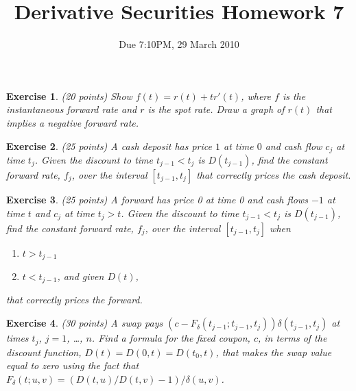 \documentclass[11pt,fleqn]{amsproc}
\newtheorem{xca}{Exercise}
\begin{document}
\title{Derivative Securities Homework 7}
\author{Due 7:10PM, 29 March 2010}

\maketitle


\begin{xca}{(20 points)}
Show $f(t) = r(t) + t r'(t)$, where $f$ is the instantaneous forward rate and
$r$ is the spot rate. Draw a graph of $r(t)$ that implies a
negative forward rate.
\end{xca}

\begin{xca}{(25 points)}
A cash deposit has price $1$ at time $0$ and cash flow $c_j$ at time $t_j$.
Given the discount to time $t_{j-1} < t_j$ is $D(t_{j-1})$, find the
constant forward rate, $f_j$,
over the interval $[t_{j-1}, t_j]$ that correctly prices the cash deposit.
\end{xca}

\begin{xca}{(25 points)}
A forward has price 0 at time 0 and cash flows $-1$ at time $t$ and $c_j$ at time $t_j > t$. Given
the discount to time $t_{j-1} < t_j$ is $D(t_{j-1})$, find the constant forward rate, $f_j$,
over the interval $[t_{j-1}, t_j]$ when
\begin{enumerate}
\item $t > t_{j-1}$
\item $t < t_{j-1}$, and given $D(t)$,
\end{enumerate}
that correctly prices the forward.
\end{xca}

\begin{xca}{(30 points)}
A swap pays $(c - F_\delta(t_{j-1}; t_{j-1}, t_j))\delta(t_{j-1}, t_j)$ at times $t_j$, $j = 1$, \dots, $n$.
Find a formula for the fixed coupon, $c$, in terms of the discount function, $D(t) = D(0,t) = D(t_0, t)$, that makes the
swap value equal to zero using the fact that $F_\delta(t; u, v) = (D(t, u)/D(t, v) - 1)/\delta(u, v)$.
\end{xca}
\end{document}
